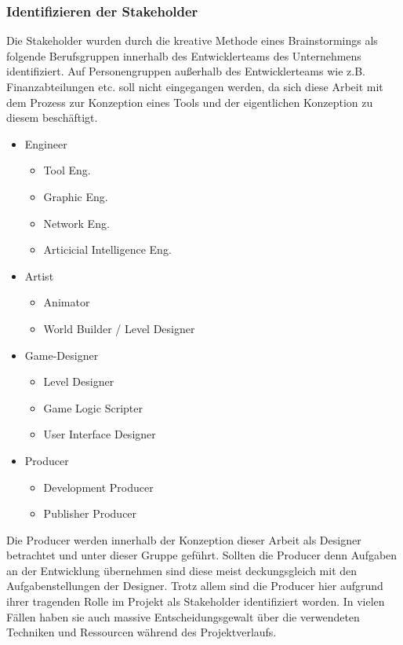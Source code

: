 \documentclass[pagesize, paper=a4, fontsize=12pt, titlepage=true, headings=small, headnosepline, abstractoff, liststotoc, nochapterprefix, plainheadsepline, twoside]{scrreprt}
\begin{document}
\subsubsection{Identifizieren der Stakeholder}
Die Stakeholder wurden durch die kreative Methode eines Brainstormings als folgende Berufsgruppen innerhalb des Entwicklerteams des Unternehmens identifiziert. Auf Personengruppen außerhalb des Entwicklerteams wie z.B. Finanzabteilungen etc. soll nicht eingegangen werden, da sich diese Arbeit mit dem Prozess zur Konzeption eines Tools und der eigentlichen Konzeption zu diesem beschäftigt.
\begin{itemize}
\item Engineer
	\begin{itemize}
	\item Tool Eng.
	\item Graphic Eng.
	\item Network Eng.
	\item Articicial Intelligence Eng.
	\end{itemize}
\item Artist
	\begin{itemize}
	\item Animator
	\item World Builder / Level Designer
	\end{itemize}
\item Game-Designer
	\begin{itemize}
	\item Level Designer
	\item Game Logic Scripter
	\item User Interface Designer
	\end{itemize}
\item Producer
	\begin{itemize}
	\item Development Producer
	\item Publisher Producer
	\end{itemize}
\end{itemize}
Die Producer werden innerhalb der Konzeption dieser Arbeit als Designer betrachtet und unter dieser Gruppe geführt. Sollten die Producer denn Aufgaben an der Entwicklung übernehmen sind diese meist deckungsgleich mit den Aufgabenstellungen der Designer. Trotz allem sind die Producer hier aufgrund ihrer tragenden Rolle im Projekt als Stakeholder identifiziert worden. In vielen Fällen haben sie auch massive Entscheidungsgewalt über die verwendeten Techniken und Ressourcen während des Projektverlaufs.
\end{document}
